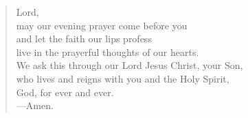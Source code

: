 \prayer

\setlength{\vleftmargin}{\prayerleftmargini}

\begin{verse}
Lord,\\
may our evening prayer come before you\\
and let the faith our lips profess\\
live in the prayerful thoughts of our hearts.\\
We ask this through our Lord Jesus Christ, your Son,\\
who lives and reigns with you and the Holy Spirit,\\
God, for ever and ever.\\
{\color{red}---\thinspace}Amen.
\end{verse}

\setlength{\vleftmargin}{\defleftmargini}